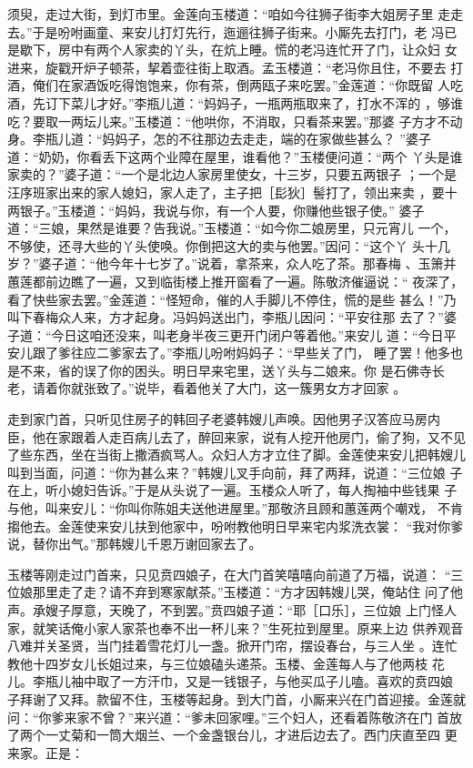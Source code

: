 须臾，走过大街，到灯市里。金莲向玉楼道：“咱如今往狮子街李大姐房子里
走走去。”于是吩咐画童、来安儿打灯先行，迤逦往狮子街来。小厮先去打门，老
冯已是歇下，房中有两个人家卖的丫头，在炕上睡。慌的老冯连忙开了门，让众妇
女进来，旋戳开炉子顿茶，挈着壶往街上取酒。孟玉楼道：“老冯你且住，不要去
打酒，俺们在家酒饭吃得饱饱来，你有茶，倒两瓯子来吃罢。”金莲道：“你既留
人吃酒，先订下菜儿才好。”李瓶儿道：“妈妈子，一瓶两瓶取来了，打水不浑的
，够谁吃？要取一两坛儿来。”玉楼道：“他哄你，不消取，只看茶来罢。”那婆
子方才不动身。李瓶儿道：“妈妈子，怎的不往那边去走走，端的在家做些甚么？
”婆子道：“奶奶，你看丢下这两个业障在屋里，谁看他？”玉楼便问道：“两个
丫头是谁家卖的？”婆子道：“一个是北边人家房里使女，十三岁，只要五两银子
；一个是汪序班家出来的家人媳妇，家人走了，主子把［髟狄］髻打了，领出来卖
，要十两银子。”玉楼道：“妈妈，我说与你，有一个人要，你赚他些银子使。”
婆子道：“三娘，果然是谁要？告我说。”玉楼道：“如今你二娘房里，只元宵儿
一个，不够使，还寻大些的丫头使唤。你倒把这大的卖与他罢。”因问：“这个丫
头十几岁？”婆子道：“他今年十七岁了。”说着，拿茶来，众人吃了茶。那春梅
、玉箫并蕙莲都前边瞧了一遍，又到临街楼上推开窗看了一遍。陈敬济催逼说：“
夜深了，看了快些家去罢。”金莲道：“怪短命，催的人手脚儿不停住，慌的是些
甚么！”乃叫下春梅众人来，方才起身。冯妈妈送出门，李瓶儿因问：“平安往那
去了？”婆子道：“今日这咱还没来，叫老身半夜三更开门闭户等着他。”来安儿
道：“今日平安儿跟了爹往应二爹家去了。”李瓶儿吩咐妈妈子：“早些关了门，
睡了罢！他多也是不来，省的误了你的困头。明日早来宅里，送丫头与二娘来。你
是石佛寺长老，请着你就张致了。”说毕，看着他关了大门，这一簇男女方才回家
。

走到家门首，只听见住房子的韩回子老婆韩嫂儿声唤。因他男子汉答应马房内
臣，他在家跟着人走百病儿去了，醉回来家，说有人挖开他房门，偷了狗，又不见
了些东西，坐在当街上撒酒疯骂人。众妇人方才立住了脚。金莲使来安儿把韩嫂儿
叫到当面，问道：“你为甚么来？”韩嫂儿叉手向前，拜了两拜，说道：“三位娘
子在上，听小媳妇告诉。”于是从头说了一遍。玉楼众人听了，每人掏袖中些钱果
子与他，叫来安儿：“你叫你陈姐夫送他进屋里。”那敬济且顾和蕙莲两个嘲戏，
不肯搊他去。金莲使来安儿扶到他家中，吩咐教他明日早来宅内浆洗衣裳：
“我对你爹说，替你出气。”那韩嫂儿千恩万谢回家去了。

玉楼等刚走过门首来，只见贲四娘子，在大门首笑嘻嘻向前道了万福，说道：
“三位娘那里走了走？请不弃到寒家献茶。”玉楼道：“方才因韩嫂儿哭，俺站住
问了他声。承嫂子厚意，天晚了，不到罢。”贲四娘子道：“耶［口乐］，三位娘
上门怪人家，就笑话俺小家人家茶也奉不出一杯儿来？”生死拉到屋里。原来上边
供养观音八难并关圣贤，当门挂着雪花灯儿一盏。掀开门帘，摆设春台，与三人坐
。连忙教他十四岁女儿长姐过来，与三位娘磕头递茶。玉楼、金莲每人与了他两枝
花儿。李瓶儿袖中取了一方汗巾，又是一钱银子，与他买瓜子儿嗑。喜欢的贲四娘
子拜谢了又拜。款留不住，玉楼等起身。到大门首，小厮来兴在门首迎接。金莲就
问：“你爹来家不曾？”来兴道：“爹未回家哩。”三个妇人，还看着陈敬济在门
首放了两个一丈菊和一筒大烟兰、一个金盏银台儿，才进后边去了。西门庆直至四
更来家。正是：

